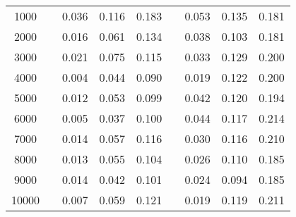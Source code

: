 % 
\begin{tabular}{ccccccccc}
  \hline
  \hline
1000 &  & 0.036 & 0.116 & 0.183 &  & 0.053 & 0.135 & 0.181 \\ 
  2000 &  & 0.016 & 0.061 & 0.134 &  & 0.038 & 0.103 & 0.181 \\ 
  3000 &  & 0.021 & 0.075 & 0.115 &  & 0.033 & 0.129 & 0.200 \\ 
  4000 &  & 0.004 & 0.044 & 0.090 &  & 0.019 & 0.122 & 0.200 \\ 
  5000 &  & 0.012 & 0.053 & 0.099 &  & 0.042 & 0.120 & 0.194 \\ 
  6000 &  & 0.005 & 0.037 & 0.100 &  & 0.044 & 0.117 & 0.214 \\ 
  7000 &  & 0.014 & 0.057 & 0.116 &  & 0.030 & 0.116 & 0.210 \\ 
  8000 &  & 0.013 & 0.055 & 0.104 &  & 0.026 & 0.110 & 0.185 \\ 
  9000 &  & 0.014 & 0.042 & 0.101 &  & 0.024 & 0.094 & 0.185 \\ 
  10000 &  & 0.007 & 0.059 & 0.121 &  & 0.019 & 0.119 & 0.211 \\ 
   \hline
\end{tabular}
